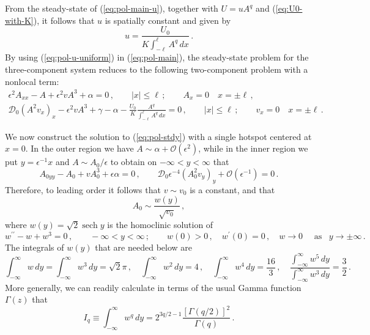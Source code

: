 \documentclass{article}%
\DeclareMathOperator{\sech}{sech}
\newcommand{\bsub}{\begin{subequations}}
\newcommand{\esub}{\end{subequations}$\!$}
\begin{document}
From the steady-state of (\ref{eq:pol-main-u}), together with
$U=uA^{q}$ and (\ref{eq:U0-with-K}), it follows that $u$ is spatially 
constant and given by
\begin{equation}
u=\frac{U_{0}}{K\int_{-\ell}^{\ell}A^{q}\, dx} \,. \label{eq:pol-u-uniform}
\end{equation}
By using (\ref{eq:pol-u-uniform}) in (\ref{eq:pol-main}), the
steady-state problem for the three-component system reduces to the
following two-component problem with a nonlocal term:
\bsub\label{eq:pol-stdy}
\begin{gather}
\epsilon^{2}A_{xx}-A+\epsilon^{2}vA^{3}+\alpha=0\,,\qquad |x|\leq \ell\,;
 \qquad A_x=0 \quad x=\pm \ell \,, \label{eq:pol-stdy-A}\\
{\mathcal D}_{0}\left(A^{2}v_{x}\right)_{x}-\epsilon^{2}vA^{3}+\gamma-\alpha-
\frac{U_{0}}{K}\frac{A^{q}}{\int_{-\ell}^{\ell}A^{q}\, dx}=0\,, \qquad
 |x|\leq \ell\,; \qquad v_x=0 \quad x=\pm \ell \,. \label{eq:pol-stdy-v}
\end{gather}
\esub

We now construct the solution to (\ref{eq:pol-stdy}) with a single
hotspot centered at $x=0$. In the outer region we have
$A\sim\alpha+{\mathcal O}(\epsilon^{2})$, while in the inner region we
put $y=\epsilon^{-1}x$ and $A\sim A_{0}/\epsilon$ to obtain on
$-\infty<y<\infty$ that
\begin{equation*}
A_{0yy}-A_{0}+vA_{0}^{3}+\epsilon\alpha = 0 \,, \qquad
{\mathcal D}_{0}\epsilon^{-4}\left(A_{0}^{2}v_{y}\right)_{y}+{\mathcal
  O}(\epsilon^{-1}) = 0\,.
\end{equation*}
Therefore, to leading order it follows that $v\sim v_{0}$ is a constant,
and that
\begin{equation}
A_{0} \sim \frac{w(y)}{\sqrt{v_{0}}} \,, \label{eq:pol-A-leading}
\end{equation}
where $w(y)=\sqrt{2}\sech y$ is the homoclinic solution of 
\begin{equation}\label{wground}
 w^{\prime\prime}-w+w^{3}=0\,,\qquad-\infty<y<\infty\,; \qquad
w(0)>0\,,\quad w^{\prime}(0)=0\,,\quad w\to0 \quad \mbox{ as }\,\,\, 
y\to\pm\infty\,.
\end{equation}
The integrals of $w(y)$ that are needed below are
\begin{equation}\label{ss:int} 
 \int_{-\infty}^{\infty}w \, dy=
\int_{-\infty}^{\infty}w^{3} \, dy=\sqrt{2}\pi\,, \quad
\int_{-\infty}^{\infty}w^{2}\,dy=4\,,\quad\int_{-\infty}^{\infty}w^{4}\, dy=
  \frac{16}{3}\,, 
\quad \frac{\int_{-\infty}^{\infty}w^{5}\, dy}{\int_{-\infty}^{\infty}w^{3}\,dy}
 =\frac{3}{2}\,.
\end{equation}
More generally, we can readily calculate in terms of the usual Gamma
function $\Gamma(z)$ that
\begin{equation}
I_{q}\equiv \int_{-\infty}^{\infty}w^{q}\, dy=
2^{3q/2-1}\frac{\left[\Gamma(q/2)\right]^2}{\Gamma(q)}\,. 
\label{eq:I_q-general-formula}
\end{equation}
\end{document}
